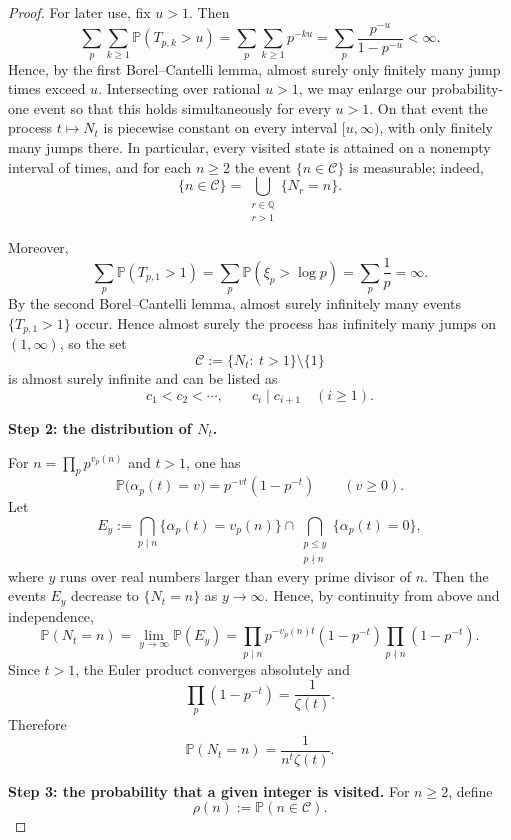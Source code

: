 \documentclass[11pt,letterpaper,reqno]{amsart}
\theoremstyle{definition}
\numberwithin{equation}{section}
\newcommand{\1}{\mathbf 1}
\begin{document}
\begin{proof}
For later use, fix \(u>1\). Then
\[
\sum_p\sum_{k\ge 1}\mathbb P(T_{p,k}>u)
=
\sum_p\sum_{k\ge 1} p^{-ku}
=
\sum_p\frac{p^{-u}}{1-p^{-u}}
<\infty.
\]
Hence, by the first Borel--Cantelli lemma, almost surely only finitely many jump times exceed \(u\). Intersecting over rational \(u>1\), we may enlarge our probability-one event so that this holds simultaneously for every \(u>1\). On that event the process \(t\mapsto N_t\) is piecewise constant on every interval \([u,\infty)\), with only finitely many jumps there. In particular, every visited state is attained on a nonempty interval of times, and for each \(n\ge 2\) the event \(\{n\in\mathcal C\}\) is measurable; indeed,
\[
\{n\in\mathcal C\}
=
\bigcup_{\substack{r\in\mathbb Q\\ r>1}}\{N_r=n\}.
\]


Moreover,
\[
\sum_p \mathbb P(T_{p,1}>1)=\sum_p \mathbb P(\xi_p>\log p)=\sum_p \frac1p=\infty.
\]
By the second Borel--Cantelli lemma, almost surely infinitely many events $\{T_{p,1}>1\}$ occur. Hence almost surely the process has infinitely many jumps on $(1,\infty)$, so the set
\[
\mathcal C:=\{N_t:\ t>1\}\setminus\{1\}
\]
is almost surely infinite and can be listed as
\[
c_1<c_2<\cdots,\qquad c_i\mid c_{i+1}\quad (i\ge 1).
\]

\medskip

\noindent
{\bf Step 2: the distribution of $N_t$.}

For $n=\prod_p p^{v_p(n)}$ and $t>1$, one has
\[
\mathbb P\bigl(\alpha_p(t)=v\bigr)=p^{-vt}(1-p^{-t})\qquad (v\ge 0).
\]
Let
\[
E_y:=
\bigcap_{p\mid n}\{\alpha_p(t)=v_p(n)\}
\cap
\bigcap_{\substack{p\le y\\ p\nmid n}}\{\alpha_p(t)=0\},
\]
where $y$ runs over real numbers larger than every prime divisor of $n$.
Then the events $E_y$ decrease to $\{N_t=n\}$ as $y\to\infty$.
Hence, by continuity from above and independence,
\[
\mathbb P(N_t=n)
=
\lim_{y\to\infty}\mathbb P(E_y)
=
\prod_{p\mid n} p^{-v_p(n)t}(1-p^{-t})
\prod_{p\nmid n}(1-p^{-t}).
\]
Since $t>1$, the Euler product converges absolutely and
\[
\prod_p(1-p^{-t})=\frac{1}{\zeta(t)}.
\]
Therefore
\begin{equation}\label{eq:Nt-distribution}
\mathbb P(N_t=n)=\frac{1}{n^t\zeta(t)}.
\end{equation}






\medskip

\noindent
{\bf Step 3: the probability that a given integer is visited.}
For $n\ge 2$, define
\[
\rho(n):=\mathbb P(n\in\mathcal C).
\]


\end{proof}
\end{document}
